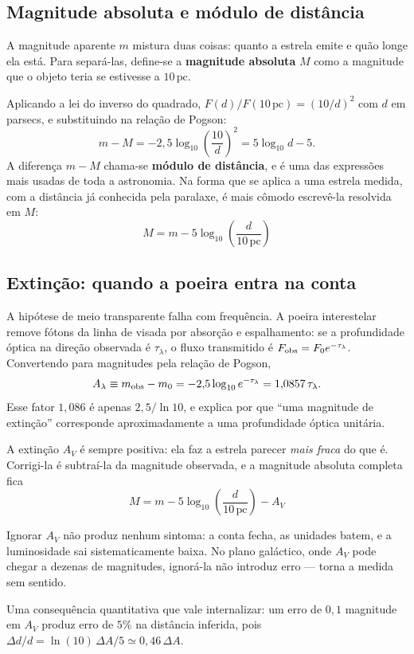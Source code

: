 \documentclass[11pt,a4paper]{article}
\begin{document}
\subsection*{Magnitude absoluta e módulo de distância}

A magnitude aparente $m$ mistura duas coisas: quanto a estrela emite e quão longe ela está. Para separá-las, define-se a \textbf{magnitude absoluta} $M$ como a magnitude que o objeto teria se estivesse a $10\,\mathrm{pc}$.

Aplicando a lei do inverso do quadrado, $F(d)/F(10\,\mathrm{pc})=(10/d)^{2}$ com $d$ em parsecs, e substituindo na relação de Pogson:
\[
m-M=-2{,}5\log_{10}\left(\frac{10}{d}\right)^{2}=5\log_{10}d-5 .
\]
A diferença $m-M$ chama-se \textbf{módulo de distância}, e é uma das expressões mais usadas de toda a astronomia. Na forma que se aplica a uma estrela medida, com a distância já conhecida pela paralaxe, é mais cômodo escrevê-la resolvida em $M$:
\[
\boxed{\ M=m-5\log_{10}\!\left(\frac{d}{10\,\mathrm{pc}}\right)\ }
\]

\subsection*{Extinção: quando a poeira entra na conta}

A hipótese de meio transparente falha com frequência. A poeira interestelar remove fótons da linha de visada por absorção e espalhamento: se a profundidade óptica na direção observada é $\tau_\lambda$, o fluxo transmitido é $F_{\rm obs}=F_0e^{-\tau_\lambda}$. Convertendo para magnitudes pela relação de Pogson,
\[
A_\lambda\equiv m_{\rm obs}-m_0=-2{,}5\log_{10}e^{-\tau_\lambda}=1{,}0857\,\tau_\lambda .
\]
Esse fator $1{,}086$ é apenas $2{,}5/\ln10$, e explica por que ``uma magnitude de extinção'' corresponde aproximadamente a uma profundidade óptica unitária.

A extinção $A_V$ é sempre positiva: ela faz a estrela parecer \emph{mais fraca} do que é. Corrigi-la é subtraí-la da magnitude observada, e a magnitude absoluta completa fica
\[
\boxed{\ M=m-5\log_{10}\!\left(\frac{d}{10\,\mathrm{pc}}\right)-A_V\ }
\]

Ignorar $A_V$ não produz nenhum sintoma: a conta fecha, as unidades batem, e a luminosidade sai sistematicamente baixa. No plano galáctico, onde $A_V$ pode chegar a dezenas de magnitudes, ignorá-la não introduz erro --- torna a medida sem sentido.

Uma consequência quantitativa que vale internalizar: um erro de $0{,}1$ magnitude em $A_V$ produz erro de $5\%$ na distância inferida, pois $\Delta d/d=\ln(10)\,\Delta A/5\simeq0{,}46\,\Delta A$.
\end{document}
